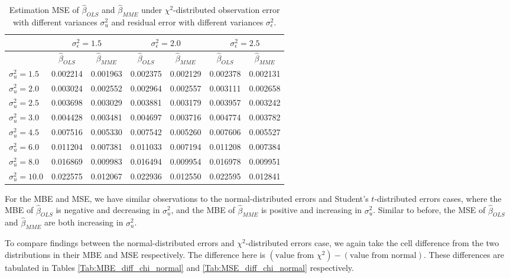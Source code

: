 \documentclass{article}
\begin{document}
\begin{table}[ht]
    \centering
    \caption{Estimation MSE of $\hat{\beta}_{OLS}$ and $\hat{\beta}_{MME}$ under $\chi^2$-distributed observation error with different variances $\sigma^2_u$ and residual error with different variances $\sigma^2_\epsilon$.}
    \label{Tab:MSE_chi}
    \begin{tabular}[t]{lcccccc}
        \hline
        &\multicolumn{2}{c}{$\sigma^2_\epsilon=1.5$}&\multicolumn{2}{c}{$\sigma^2_\epsilon=2.0$}&\multicolumn{2}{c}{$\sigma^2_\epsilon=2.5$}\\
        \hline
        &$\hat{\beta}_{OLS}$&$\hat{\beta}_{MME}$&$\hat{\beta}_{OLS}$&$\hat{\beta}_{MME}$&$\hat{\beta}_{OLS}$&$\hat{\beta}_{MME}$\\
        \hline
        $\sigma^2_u = 1.5$&0.002214&0.001963&0.002375&0.002129&0.002378&0.002131\\
        $\sigma^2_u = 2.0$&0.003024&0.002552&0.002964&0.002557&0.003111&0.002658\\
        $\sigma^2_u = 2.5$&0.003698&0.003029&0.003881&0.003179&0.003957&0.003242\\
        $\sigma^2_u = 3.0$&0.004428&0.003481&0.004697&0.003716&0.004774&0.003782\\
        $\sigma^2_u = 4.5$&0.007516&0.005330&0.007542&0.005260&0.007606&0.005527\\
        $\sigma^2_u = 6.0$&0.011204&0.007381&0.011033&0.007194&0.011208&0.007384\\
        $\sigma^2_u = 8.0$&0.016869&0.009983&0.016494&0.009954&0.016978&0.009951\\
        $\sigma^2_u = 10.0$&0.022575&0.012067&0.022936&0.012550&0.022595&0.012841\\
    \end{tabular}
\end{table}

For the MBE and MSE, we have similar observations to the normal-distributed errors and Student's $t$-distributed errors cases,
where the MBE of $\hat{\beta}_{OLS}$ is negative and decreasing in $\sigma^2_u$, 
and the MBE of $\hat{\beta}_{MME}$ is positive and increasing in $\sigma^2_u$.
Similar to before, the MSE of $\hat{\beta}_{OLS}$ and $\hat{\beta}_{MME}$ are both increasing in $\sigma^2_u$.

To compare findings between the normal-distributed errors and $\chi^2$-distributed errors case,
we again take the cell difference from the two distributions in their MBE and MSE respectively.
The difference here is $(\textrm{value from } \chi^2) - (\textrm{value from normal})$. 
These differences are tabulated in Tables \ref{Tab:MBE_diff_chi_normal} and \ref{Tab:MSE_diff_chi_normal} respectively.
\end{document}
